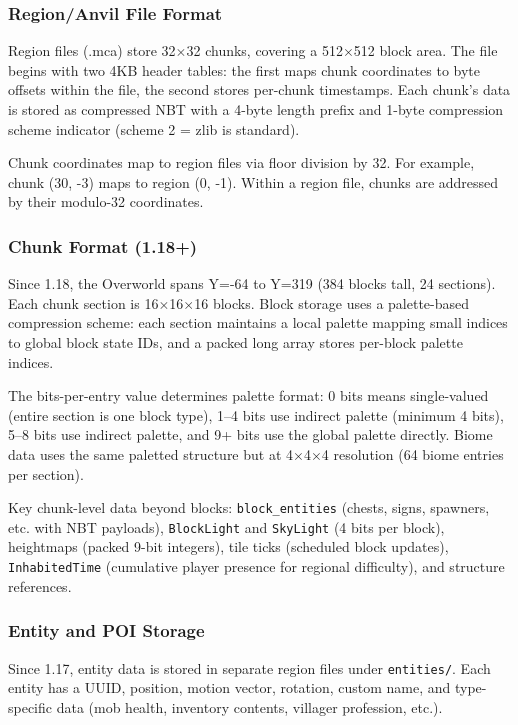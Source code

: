 \documentclass[11pt,letterpaper]{article}
\begin{document}
\subsubsection{Region/Anvil File Format}
Region files (.mca) store 32$\times$32 chunks, covering a 512$\times$512 block area. The file begins with two 4KB header tables: the first maps chunk coordinates to byte offsets within the file, the second stores per-chunk timestamps. Each chunk's data is stored as compressed NBT with a 4-byte length prefix and 1-byte compression scheme indicator (scheme 2 = zlib is standard).

Chunk coordinates map to region files via floor division by 32. For example, chunk (30, -3) maps to region (0, -1). Within a region file, chunks are addressed by their modulo-32 coordinates.

\subsubsection{Chunk Format (1.18+)}
Since 1.18, the Overworld spans Y=-64 to Y=319 (384 blocks tall, 24 sections). Each chunk section is 16$\times$16$\times$16 blocks. Block storage uses a palette-based compression scheme: each section maintains a local palette mapping small indices to global block state IDs, and a packed long array stores per-block palette indices.

The bits-per-entry value determines palette format: 0 bits means single-valued (entire section is one block type), 1--4 bits use indirect palette (minimum 4 bits), 5--8 bits use indirect palette, and 9+ bits use the global palette directly. Biome data uses the same paletted structure but at 4$\times$4$\times$4 resolution (64 biome entries per section).

Key chunk-level data beyond blocks: \texttt{block\_entities} (chests, signs, spawners, etc. with NBT payloads), \texttt{BlockLight} and \texttt{SkyLight} (4 bits per block), heightmaps (packed 9-bit integers), tile ticks (scheduled block updates), \texttt{InhabitedTime} (cumulative player presence for regional difficulty), and structure references.

\subsubsection{Entity and POI Storage}
Since 1.17, entity data is stored in separate region files under \texttt{entities/}. Each entity has a UUID, position, motion vector, rotation, custom name, and type-specific data (mob health, inventory contents, villager profession, etc.).
\end{document}
